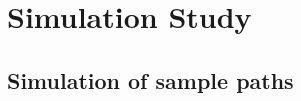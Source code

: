 \documentclass[preprint,12pt,authoryear]{elsarticle}
\begin{document}

\clearpage

\let\thm\suppthm
\let\endthm\endsuppthm
\let\lem\supplem
\let\endlem\endsupplem
\let\prop\suppprop
\let\endprop\endsuppprop
\let\cor\suppcor
\let\endcor\endsuppcor
\let\definition\suppdefinition
\let\enddefinition\endsuppdefinition
\let\example\suppexample
\let\endexample\endsuppexample
\let\rem\supprem
\let\endrem\endsupprem

\appendix
\renewcommand{\thesection}{\Alph{section}}



\section{Simulation Study}\label{sa}


\subsection{Simulation of sample paths}
\end{document}
